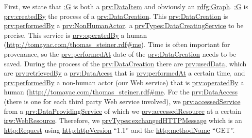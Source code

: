\documentclass[conference]{IEEEtran}
\begin{document}
First, we state that \url{:G} is both a \url{prv:DataItem} and obviously an \url{rdfg:Graph}. \url{:G} is \url{prv:createdBy} the process of a \url{prv:DataCreation}. This \url{prv:DataCreation} is \url{prv:performedBy} a \url{prv:NonHumanActor}, a \url{prvTypes:DataCreatingService} to be precise. This service is \url{prv:operatedBy} a
human (\url{http://tomayac.com/thomas_steiner.rdf#me}). Time is often important for provenance, so the \url{prv:performedAt} date of the \url{prv:DataCreation} needs to be saved. During the process of the \url{prv:DataCreation} there are \url{prv:usedData}, which are \url{prv:retrievedBy} a \url{prv:DataAcess} that is \url{prv:performedAt} a certain time, and \url{prv:performedBy} a non-human actor (our Web service) that is \url{prv:operatedBy} a human (\url{http://tomayac.com/thomas_steiner.rdf#me}. For the \url{prv:DataAccess} (there is one for each third party Web service involved), we \url{prv:accessedService} from a \url{prv:DataProvidingService} of which we \url{prv:accessedResource} at a certain \url{irw:WebResource}. Therefore, we \url{prvTypes:exchangedHTTPMessage} which is an \url{http:Request} using \url{http:httpVersion} ``1.1'' and the \url{http:methodName} ``GET''.
\end{document}
